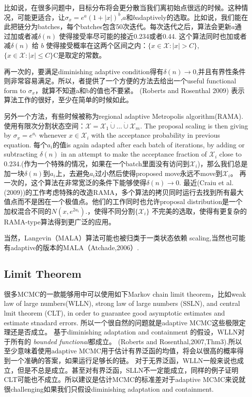 \documentclass[
]{book}
\theoremstyle{definition}
\theoremstyle{definition}
\theoremstyle{definition}
\theoremstyle{remark}
\begin{document}
比如说，在很多问题中，目标分布将会更分散当我们离初始点很远的时候。这种情况，可能更适合，让\(\sigma_x=e^{a}(1+|x|)^{b}\),\(a\)和\(b\)adaptively的选取。比如说，我们能在此把链分为batches，每个batches包含50次迭代。每次迭代之后，算法会更新\(a\)通过加或者减\(\delta(n)\) 使得接受率尽可能的接近0.234或者0.44. 这个算法同时也加或者减\(\delta(n)\) 给 \(b\) 使得接受概率在这两个区间之内：\(\{x \in \mathcal{X} :|x|>C\}\),\(\{x \in \mathcal{X} :|x| \leq C\}\)C是取定的常数。

再一次的，要满足diminishing adaptive condition得有\(\delta(n)\rightarrow 0\),并且有界性条件则非常容易满足。所以，者提供了一个方便的方法去给出一个useful functional form to \(\sigma_x\)，就算不知道a和b的值也不要紧。 (Roberts and Rosenthal 2009) 表示算法工作的很好，至少在简单的时候如此。

另外一个方法，有些时候被称为regional adaptive Metropolis algorithm(RAMA).使用有限次分割状态空间：\(\mathcal{X}=\mathcal{X}_{1} \dot{\cup} \ldots \dot{\cup} \mathcal{X}_{m}\). The proposal scaling is then giving by \(\sigma_x=e^{a_i}\) whenever \(x\in \mathcal X_i\) with the acceptance probability in previous equation. 每个\(a_i\)的值is again adapted after each batch of iterations, by adding or subtracting \(\delta(n)\) in an attempt to make the acceptance fraction of \(\mathcal X_i\) close to 0.234.(作为一个特殊的情况，如果在一个batch里面没有访问到\(\mathcal X_i\))，那么我们总是加一块\(\delta(n)\)到\(a_i\)上，去避免\(a_i\)过小然后使得proposed move永远不move到\(\mathcal X_i\)。 再一次的，这个算法在非常宽泛的条件下能够使得\(\delta(n)\rightarrow 0\).
最近(Craiu et al.(2009))的工作考虑特殊的改造RAMA，多个算法的拷贝同时运行去找到所有最大值点而不是困在一个极值点。他们的工作同时也允许proposal distribution是一个加权混合不同的\(N\left(x, e^{2 a_{i}}\right)\).，使得不同分割\(\{\mathcal X_i\}\) 不完美的选取，使得有更复杂的RAMA-type算法得到更广泛的应用。

当然，Langevin（MALA）算法可能也被归类于一类状态依赖 scaling,当然也可能有adaptive的版本的MALA（Atchade,2006）.

\hypertarget{limit-theorem}{%
\subsection{Limit Theorem}\label{limit-theorem}}

很多MCMC的一款能够用中可以使用如下Markov chain limit theorem，比如weak law of large numbers(WLLN), strong law of large numbers (SSLN), and central lmit theorem (CLT), in order to guarantee good asymptotic estimates and estimate stnadard errors.
所以一个很自然的问题就是adaptive MCMC这些极限定理还是否成立。
基于diminishing adaptation and containment 的假设，WLLN对于所有的 \emph{bounded functional}都成立。 (Roberts and Rosenthal,2007,Thm3).所以至少意味着使用adaptive MCMC用于估计有界泛函的均值，将会以很高的概率得到一个准确的答案，如果运行足够长的链。
对于无界泛函，WLLN一般来说也成立，但是不总是成立。甚至对有界泛函，SLLN不一定能成立，同样的例子证明CLT可能也不成立。所以建议是估计MCMC的标准差对于adaptive MCMC来说就很challenging如果我们只假设diminishing adaptation and containment.
\end{document}
